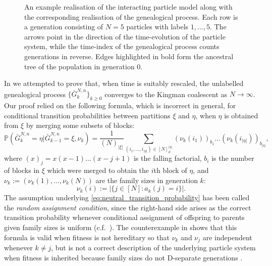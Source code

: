 \documentclass[a4paper,11pt]{article}
\theoremstyle{definition}
\newcommand{\bbP}{\mathbb{P}}
\begin{document}
\begin{figure}[!ht]
{
	}
\caption{An example realisation of the interacting particle model along with the corresponding realisation of the genealogical process.
Each row is a generation consisting of $N=5$ particles with labels $1, \ldots, 5$.
The arrows point in the direction of the time-evolution of the particle system, while the time-index of the genealogical process counts generations in reverse.
Edges highlighted in bold form the ancestral tree of the population in generation 0.}
\label{wright-fisher}
\end{figure}

In \cite{koskela2020annals} we attempted to prove that, when time is suitably rescaled, the unlabelled genealogical process $\{ \bar{ G }_k^{ N, n } \}_{k \geq 0}$ converges to the Kingman coalescent as $N \to \infty$.
Our proof relied on the following formula, which is incorrect in general, for conditional transition probabilities between partitions $\xi$ and $\eta$, when $\eta$ is obtained from $\xi$ by merging some subsets of blocks:
\begin{equation}\label{eq:neutral_transition_probability}
\bbP( \bar{ G }_k^{ N, n } = \eta | \bar{ G }_{ k - 1 }^{ N, n } = \xi, \nu_k ) = \frac{ 1 }{ ( N )_{ | \xi | } } \sum_{ ( i_1, \ldots, i_{ | \eta | } ) \in [ N ]_d^{ | \eta | } } ( \nu_k( i_1 ) )_{ b_1 } \ldots ( \nu_k( i_{ | \eta | } ) )_{ b_{ | \eta | } },
\end{equation}
where $( x )_j = x ( x - 1 ) \ldots ( x - j + 1)$ is the falling factorial, $b_i$ is the number of blocks in $\xi$ which were merged to obtain the $i$th block of $\eta$, and $\nu_k := ( \nu_k( 1 ), \ldots, \nu_k( N ) )$ are the family sizes in generation $k$:
\begin{equation*}
\nu_k( i ) := | \{ j \in [ N ] : a_k( j ) = i \} |.
\end{equation*}
The assumption underlying \eqref{eq:neutral_transition_probability} has been called the \textit{random assignment condition}, since the right-hand side arises as the correct transition probability whenever conditional assignment of offspring to parents given family sizes is uniform (c.f.\ \cite[page 439, assumption 2]{mohle1998}).
The counterexample in \cite{rubenthaler:2023+} shows that this formula is valid when fitness is not hereditary so that $\nu_k$ and $\nu_j$ are independent whenever $k \neq j$, but is not a correct description of the underlying particle system when fitness is inherited because family sizes do not D-separate generations \cite[Figure 1]{brownetal:2021}.
\end{document}
